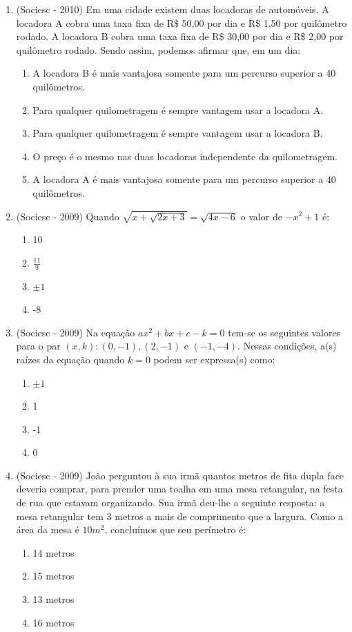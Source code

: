 \begin{enumerate}
 \item (Sociesc - 2010) Em uma cidade existem duas locadoras de automóveis. A locadora A cobra uma taxa fixa de R\$ 50,00 por dia e R\$ 1,50 por quilômetro rodado. A locadora B cobra uma taxa fixa de R\$ 30,00 por dia e R\$ 2,00 por quilômetro rodado. Sendo assim, podemos afirmar que, em um dia:
  \begin{enumerate}
  \item A locadora B é mais vantajosa somente para um percurso superior a 40 quilômetros.
  \item Para qualquer quilometragem é sempre vantagem usar a locadora A.
  \item Para qualquer quilometragem é sempre vantagem usar a locadora B.
  \item O preço é o mesmo nas duas locadoras independente da quilometragem.
  \item A locadora A é mais vantajosa somente para um percurso superior a 40 quilômetros.
 \end{enumerate}

\item (Sociesc - 2009) Quando $\sqrt{x + \sqrt{2x+3}}= \sqrt{4x-6}$ o valor de $-x^2+1$ é:
 \begin{enumerate}
  \item 10
  \item $\frac{11}{9}$
  \item $\pm 1$
  \item -8
 \end{enumerate}

 \item (Sociesc - 2009) Na equação $ax^2+bx+c-k=0$ tem-se os seguintes valores para o par $(x, k): (0,-1), (2,-1) \text{ e } (-1,-4)$. Nessas condições, a(s) raízes da equação quando $k=0$ podem ser expressa(s) como:
 \begin{enumerate}
  \item $\pm 1$
  \item 1
  \item -1
  \item 0
 \end{enumerate}

 \item (Sociesc - 2009) João perguntou à sua irmã quantos metros de fita dupla face deveria comprar, para prender uma toalha em uma mesa retangular, na festa de rua que estavam organizando. Sua irmã deu-lhe a seguinte resposta: a mesa retangular tem 3 metros a mais de comprimento que a largura. Como a área da mesa é $10 m^2$, concluímos que seu perímetro é:
  \begin{enumerate}
  \item 14 metros
  \item 15 metros
  \item 13 metros
  \item 16 metros
 \end{enumerate}


\end{enumerate}
